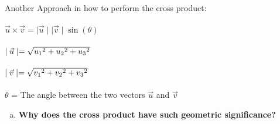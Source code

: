 \documentclass{article}
\begin{document}
\begin{enumerate}[a.]
	\\
	Another Approach in how to perform the cross product:\\
	\\
	$\vec{u} \times \vec{v} =  \mid\vec{u}\mid\mid\vec{v}\mid\sin(\theta)$\\
	\\
	$\mid\vec{u}\mid = \sqrt{u_{1}\hspace{.001cm}^{2}+u_{2}\hspace{.001cm}^{2}+u_{3}\hspace{.001cm}^{2}}$\\
	\\
	$\mid\vec{v}\mid = \sqrt{v_{1}\hspace{.001cm}^{2}+v_{2}\hspace{.001cm}^{2}+v_{3}\hspace{.001cm}^{2}}$\\
	\\
	$\theta$ = The angle between the two vectors $\vec{u}$ and $\vec{v}$
\end{enumerate}
\begin{enumerate}[b.]
	\item \textbf{Why does the cross product have such geometric significance?}\\
	      \\
\end{enumerate}
\end{document}
